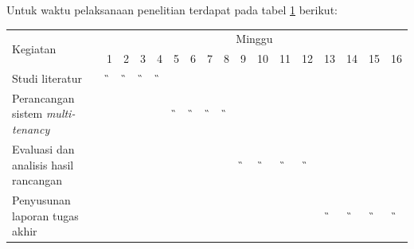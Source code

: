 Untuk waktu pelaksanaan penelitian terdapat pada tabel \ref{tbl:timeline} berikut:

\begin{table}[H]
  \begin{tabular}{|p{3.5cm}|c|c|c|c|c|c|c|c|c|c|c|c|c|c|c|c|}
    \hline
    \multirow{2}{*}{Kegiatan} & \multicolumn{16}{|c|}{Minggu}                                                                       \\
    \cline{2-17}              &
    1                         & 2                             & 3  & 4  & 5  & 6  & 7  & 8  & 9  & 10 & 11 & 12 & 13 & 14 & 15 & 16 \\
    \hline

    Studi literatur           &
    \G                        & \G                            & \G & \G & \w & \w & \w & \w & \w & \w & \w & \w & \w & \w & \w & \w \\
    \hline

    Perancangan sistem \emph{multi-tenancy} &
    \w                        & \w                            & \w & \w & \G & \G & \G & \G & \w & \w & \w & \w & \w & \w & \w & \w \\
    \hline

    Evaluasi dan analisis hasil rancangan &
    \w                        & \w                            & \w & \w & \w & \w & \w & \w & \G & \G & \G & \G & \w & \w & \w & \w \\
    \hline

    Penyusunan laporan tugas akhir &
    \w                        & \w                            & \w & \w & \w & \w & \w & \w & \w & \w & \w & \w & \G & \G & \G & \G \\
    \hline
  \end{tabular}
  \label{tbl:timeline}
\end{table}
